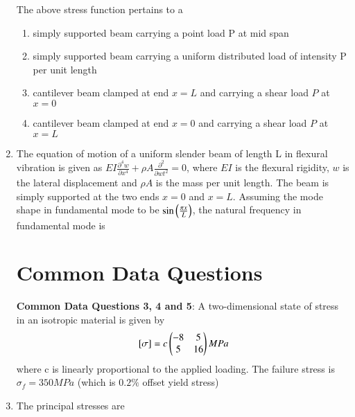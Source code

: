 \documentclass[journal,12pt,onecolumn]{IEEEtran}
\theoremstyle{remark}
\begin{document}
\begin{enumerate}
      The above stress function pertains to a 
      \begin{enumerate}
      \item simply supported beam carrying a point load P at mid span 
      \item simply supported beam carrying a uniform distributed load of intensity P per unit length 
      \item cantilever beam clamped at end $x = L$ and carrying a shear load $P$ at $x = 0$
      \item cantilever beam clamped at end $x = 0$ and carrying a shear load $P$ at $x = L$
      \end{enumerate}
\item The equation of motion of a uniform slender beam of length L in flexural vibration is given as $EI
\frac{{\partial}^4 w}{\partial {x}^{4}} + \rho A \frac{{\partial}^{2}}{\partial w {t}^{2}}=0$, where $EI$ is the flexural rigidity, $w$ is the lateral displacement and $\rho A$ is the mass per unit length. The beam is simply supported at the two ends $x =0$ and $x=L$. Assuming the mode shape in fundamental mode to be $\sin\left(\frac{{\pi x}}{L}\right)$, the natural frequency in fundamental mode is 
\begin{enumerate}
\end{enumerate}

\section{Common Data Questions}
\textbf{Common Data Questions 3, 4 and 5}: A two-dimensional state of stress in an isotropic material is given by 
\begin{align}
   {}\left[\sigma\right] = c \begin{pmatrix}-8 & 5 \\ 5 & 16\end{pmatrix} MPa
\end{align} 
where c is linearly proportional to the applied loading. The failure stress is $\sigma_{f}=350MPa$ (which is $0.2\%$ offset yield stress)
\item The principal stresses are 
\begin{enumerate}
\end{enumerate}


\end{enumerate}
\end{document}
